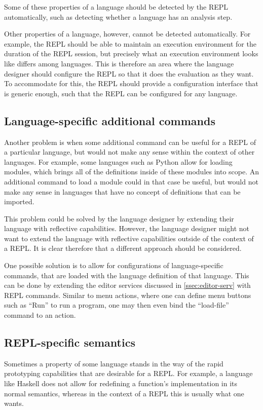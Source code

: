 Some of these properties of a language should be detected by the REPL
automatically, such as detecting whether a language has an analysis
step.

Other properties of a language, however, cannot be detected
automatically. For example, the REPL should be able to maintain an
execution environment for the duration of the REPL session, but
precisely what an execution environment looks like differs among
languages. This is therefore an area where the language designer
should configure the REPL so that it does the evaluation as they
want. To accommodate for this, the REPL should provide a configuration
interface that is generic enough, such that the REPL can be configured
for any language.

\subsection{Language-specific additional commands}
\label{sec:lang-spec-addit}
Another problem is when some additional command can be useful for a
REPL of a particular language, but would not make any sense within the
context of other languages. For example, some languages such as Python
allow for loading modules, which brings all of the definitions inside
of these modules into scope. An additional command to load a module
could in that case be useful, but would not make any sense in
languages that have no concept of definitions that can be imported.

This problem could be solved by the language designer by extending
their language with reflective capabilities. However, the language
designer might not want to extend the language with reflective
capabilities outside of the context of a REPL. It is clear therefore
that a different approach should be considered.

One possible solution is to allow for configurations of
language-specific commands, that are loaded with the language
definition of that language. This can be done by extending the editor
services discussed in \cref{ssec:editor-serv} with REPL
commands. Similar to menu actions, where one can define menu buttons
such as ``Run'' to run a program, one may then even bind the
``load-file'' command to an action.

\subsection{REPL-specific semantics}
\label{sec:repl-spec-semant}
Sometimes a property of some language stands in the way of the rapid
prototyping capabilities that are desirable for a REPL. For example, a
language like Haskell does not allow for redefining a function's
implementation in its normal semantics, whereas in the context of a
REPL this is usually what one wants.

